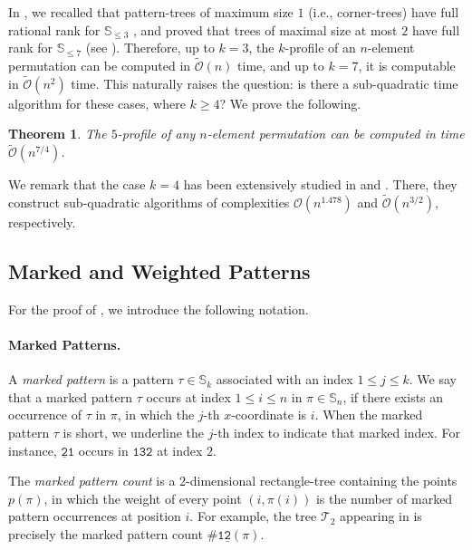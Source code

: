 \documentclass{article}
\newcommand{\Sn}{\mathbb{S}_n}
\newcommand{\pc}[2]{{\# \mathtt{ #1 } \left( #2 \right)}}
\theoremstyle{remark}
\newcommand{\Otilde}[1]{\widetilde{\mathcal{O}}\left( #1 \right)}
\newcommand{\Oh}[1]{\mathcal{O}\left( #1 \right)}
\theoremstyle{plain}
\newtheorem{thm}{Theorem}
\begin{document}
In , we recalled that pattern-trees of maximum size $1$ (i.e., corner-trees)
have full rational rank for $\mathbb{S}_{\le 3}$ \cite{even2021counting},
and proved that trees of maximal size at most $2$ have full rank for $\mathbb{S}_{\le 7}$ (see ). 
Therefore, up to $k=3$, the $k$-profile of an $n$-element permutation can be computed in $\Otilde{n}$ time,
and up to $k=7$, it is computable in $\Otilde{n^2}$ time.
This naturally raises the question: is there a sub-quadratic time algorithm for these cases, where $k \ge 4$?
We prove the following.

\begin{thm}
    \label{thm:fast-5-prof}
    The $5$-profile of any $n$-element permutation can be computed in time $\Otilde{n^{7/4}}$.
\end{thm}

We remark that the case $k=4$ has been extensively studied in \cite{dudek2020counting} and \cite{even2021counting}.
There, they construct sub-quadratic algorithms of complexities $\Oh{n^{1.478}}$ and $\Otilde{n^{3/2}}$, respectively.

\subsection{Marked and Weighted Patterns}

For the proof of , we introduce the following notation.

\paragraph{Marked Patterns.}
A \emph{marked pattern} is a pattern $\tau\in\mathbb{S}_k$ associated with an index $1\le j \le k$.
We say that a marked pattern $\tau$ occurs at index $1\le i\le n$ in $\pi\in\Sn$,
if there exists an occurrence of $\tau$ in $\pi$, in which the $j$-th $x$-coordinate is $i$.
When the marked pattern $\tau$ is short, we underline the $j$-th index to indicate that 
marked index.
For instance, $\mathtt{\underline{2}1}$ occurs in $\mathtt{132}$ at index $2$.

The \emph{marked pattern count} is a $2$-dimensional rectangle-tree containing the points $p(\pi)$,
in which the weight of every point $(i,\pi(i))$ is the number of marked pattern occurrences at position $i$.
For example, the tree $\mathcal{T}_2$ appearing in  is precisely the marked pattern count
$\pc{1\underline{2}}{\pi}$.
\end{document}
